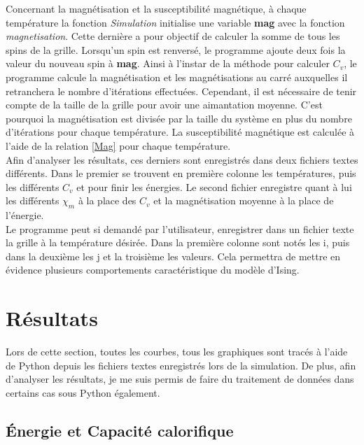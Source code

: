 \documentclass{article}
\begin{document}
Concernant la magnétisation et la susceptibilité magnétique, à chaque température la fonction \emph{Simulation} initialise une variable \textbf{mag} avec la fonction \emph{magnetisation}. Cette dernière a pour objectif de calculer la somme de tous les spins de la grille. Lorsqu'un spin est renversé, le programme ajoute deux fois la valeur du nouveau spin à \textbf{mag}. Ainsi à l'instar de la méthode pour calculer $C_{v}$, le programme calcule la magnétisation et les magnétisations au carré auxquelles il retranchera le nombre d'itérations effectuées. Cependant, il est nécessaire de tenir compte de la taille de la grille pour avoir une aimantation moyenne. C'est pourquoi la magnétisation est divisée par la taille du système en plus du nombre d'itérations pour chaque température. La susceptibilité magnétique est calculée à l'aide de la relation \ref{Mag} pour chaque température. \\

Afin d'analyser les résultats, ces derniers sont enregistrés dans deux fichiers textes différents. Dans le premier se trouvent en première colonne les températures, puis les différents $C_{v}$ et pour finir les énergies. Le second fichier enregistre quant à lui les différents $\chi_m$ à la place des $C_{v}$ et la magnétisation moyenne à la place de l'énergie. \\

Le programme peut si demandé par l'utilisateur, enregistrer dans un fichier texte la grille à la température désirée. Dans la première colonne sont notés les i, puis dans la deuxième les j et la troisième les valeurs. Cela permettra de mettre en évidence plusieurs comportements caractéristique du modèle d'Ising. 

\section{Résultats}

Lors de cette section, toutes les courbes, tous les graphiques sont tracés à l'aide de Python depuis les fichiers textes enregistrés lors de la simulation. De plus, afin d'analyser les résultats, je me suis permis de faire du traitement de données dans certains cas sous Python également.


\subsection{Énergie et Capacité calorifique}
\label{subsec:Energie et CV}
\end{document}
